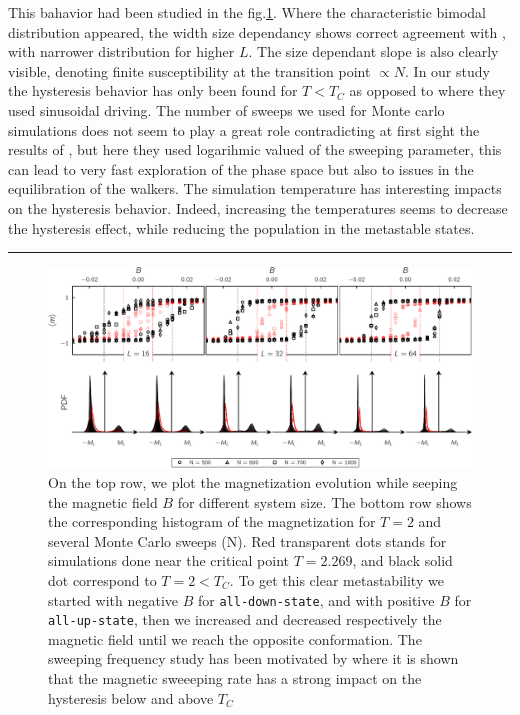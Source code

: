 \documentclass[ansiapaper]{report}
\begin{document}
\begin{multicols}{3}
This bahavior had been studied in the fig.\ref{fig:hysteresis-loop}. Where the characteristic bimodal distribution appeared, the width size dependancy shows correct agreement with \cite{Landau}, with narrower distribution for higher $L$. The size dependant slope is also clearly visible, denoting finite susceptibility at the transition point $\propto N$. In our study the hysteresis behavior has only been found for $T < T_C$ as opposed to \cite{PhysRevE.52.1399} where they used sinusoidal driving. The number of sweeps we used for Monte carlo simulations does not seem to play a great role contradicting at first sight the results of \cite{PhysRevE.52.1399}, but here they used logarihmic valued of the sweeping parameter, this can lead to very fast exploration of the phase space but also to issues in the equilibration of the walkers. The simulation temperature has interesting impacts on the hysteresis behavior. Indeed, increasing the temperatures seems to decrease the hysteresis effect, while reducing the population in the metastable states.

\end{multicols}
\par\noindent\rule{\textwidth}{0.4pt}
\begin{figure}[H]
\begin{center}
        \includegraphics[width=1\linewidth]{figures/Ising2D_1st_order_transition.pdf}
    \end{center}
    \caption{On the top row, we plot the magnetization evolution while seeping the magnetic field $B$ for different system size. The bottom row shows the corresponding histogram of the magnetization for $T = 2$ and several Monte Carlo sweeps (N). Red transparent dots stands for simulations done near the critical point $T = 2.269$, and black solid dot correspond to $T = 2 < T_C$.  To get this clear metastability we started with negative $B$ for \texttt{all-down-state}, and with positive $B$ for \texttt{all-up-state}, then we increased and decreased respectively the magnetic field until we reach the opposite conformation. The sweeping frequency study has been motivated by \cite{PhysRevE.52.1399} where it is shown that the magnetic sweeeping rate has a strong impact on the hysteresis below and above $T_C$}
    \label{fig:hysteresis-loop}
\end{figure}
\end{document}
